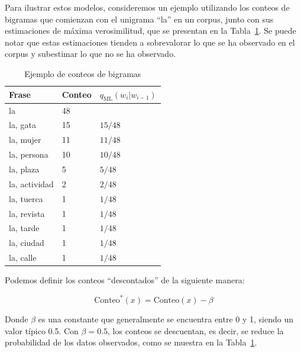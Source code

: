 \documentclass[11pt,fleqn]{book} %
\begin{document}
Para ilustrar estos modelos, consideremos un ejemplo utilizando los conteos de bigramas que comienzan con el unigrama ``la'' en un corpus, junto con sus estimaciones de máxima verosimilitud, que se presentan en la Tabla~\ref{tab:plm_ej}. Se puede notar que estas estimaciones tienden a sobrevalorar lo que se ha observado en el corpus y subestimar lo que no se ha observado.

\begin{table}[h]
    \centering
    \begin{tabular}{|l|l|l|}\hline
        \textbf{Frase} & \textbf{Conteo} & \textbf{$q_{\text{ML}}(w_i | w_{i-1})$} \\
        \hline
        la & 48 & \\
        la, gata & 15 & $15/48$ \\
        la, mujer & 11 & $11/48$ \\
        la, persona & 10 & $10/48$ \\
        la, plaza & 5 & $5/48$ \\
        la, actividad & 2 & $2/48$ \\
        la, tuerca & 1 & $1/48$ \\
        la, revista & 1 & $1/48$ \\
        la, tarde & 1 & $1/48$ \\
        la, ciudad & 1 & $1/48$ \\
        la, calle & 1 & $1/48$ \\ \hline
    \end{tabular}\caption{Ejemplo de conteos de bigramas}\label{tab:plm_ej}
\end{table}

Podemos definir los conteos ``descontados'' de la siguiente manera:

\[
\text{Conteo}^*(x) = \text{Conteo}(x) - \beta
\]

Donde $\beta$ es una constante que generalmente se encuentra entre 0 y 1, siendo un valor típico 0.5. Con $\beta=0.5$, los conteos se descuentan, es decir, se reduce la probabilidad de los datos observados, como se muestra en la Tabla~\ref{tab:plm_ej}.
\end{document}
